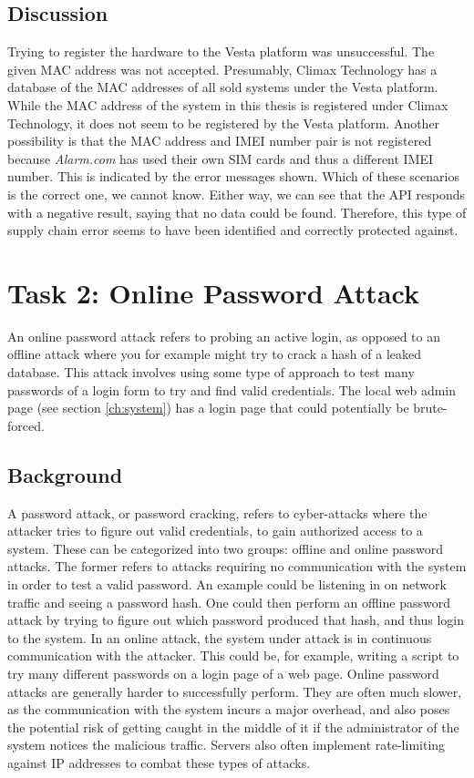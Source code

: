 \subsection{Discussion}
Trying to register the hardware to the Vesta platform was unsuccessful. The given MAC address was not accepted. Presumably, Climax Technology has a database of the MAC addresses of all sold systems under the Vesta platform. While the MAC address of the system in this thesis is registered under Climax Technology, it does not seem to be registered by the Vesta platform. Another possibility is that the MAC address and IMEI number pair is not registered because \textit{Alarm.com} has used their own SIM cards and thus a different IMEI number. This is indicated by the error messages shown. Which of these scenarios is the correct one, we cannot know. Either way, we can see that the API responds with a negative result, saying that no data could be found. Therefore, this type of supply chain error seems to have been identified and correctly protected against.

\section{Task 2: Online Password Attack}
An online password attack refers to probing an active login, as opposed to an offline attack where you for example might try to crack a hash of a leaked database. This attack involves using some type of approach to test many passwords of a login form to try and find valid credentials. The local web admin page (see section \ref{ch:system}) has a login page that could potentially be brute-forced.

\subsection{Background}
A password attack, or password cracking, refers to cyber-attacks where the attacker tries to figure out valid credentials, to gain authorized access to a system. These can be categorized into two groups: offline and online password attacks. The former refers to attacks requiring no communication with the system in order to test a valid password. An example could be listening in on network traffic and seeing a password hash. One could then perform an offline password attack by trying to figure out which password produced that hash, and thus login to the system. In an online attack, the system under attack is in continuous communication with the attacker. This could be, for example, writing a script to try many different passwords on a login page of a web page. Online password attacks are generally harder to successfully perform. They are often much slower, as the communication with the system incurs a major overhead, and also poses the potential risk of getting caught in the middle of it if the administrator of the system notices the malicious traffic. Servers also often implement rate-limiting against IP addresses to combat these types of attacks.

